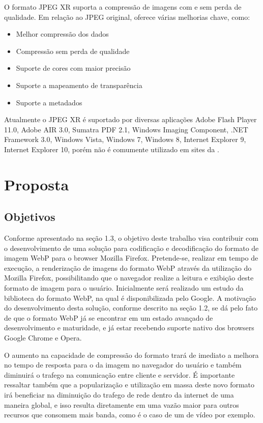 \documentclass[espaco=simples,appendix=Name]{abnt}
\begin{document}
O formato JPEG XR suporta a compressão de imagens com e sem perda de qualidade. Em relação ao JPEG original, oferece várias melhorias chave, como:
\begin{itemize}
\item Melhor compressão dos dados
\item Compressão sem perda de qualidade
\item Suporte de cores com maior precisão
\item Suporte a  mapeamento de transparência
\item Suporte a metadados
\end{itemize}

Atualmente o JPEG XR é suportado por diversas aplicações Adobe Flash Player 11.0, Adobe AIR 3.0, Sumatra PDF 2.1, Windows Imaging Component, .NET Framework 3.0, Windows Vista, Windows 7, Windows 8, Internet Explorer 9, Internet Explorer 10, porém não é comumente utilizado em sites da .\cite{HDPhoto}

\chapter{Proposta}

\section{Objetivos}

Conforme apresentado na seção 1.3, o objetivo deste trabalho visa contribuir com o desenvolvimento de uma solução para codificação e decodificação do formato de imagem WebP para o browser Mozilla Firefox. 
Pretende-se, realizar em tempo de execução, a renderização de imagens do formato WebP através da utilização do Mozilla Firefox, possibilitando que o navegador realize a leitura e exibição deste formato de imagem para o usuário. Inicialmente será realizado um estudo da biblioteca do formato WebP, na qual é disponibilizada pelo Google. 
A motivação do desenvolvimento desta solução, conforme descrito na seção 1.2, se dá pelo fato de que o formato WebP já se encontrar em um estado avançado de desenvolvimento e maturidade, e já estar recebendo suporte nativo dos browsers Google Chrome e Opera. 

O aumento na capacidade de compressão do formato  trará de imediato a melhora no tempo de resposta para o  da imagem no navegador do usuário e também diminuirá o trafego na comunicação entre cliente e servidor. É importante ressaltar também que a popularização e utilização em massa deste novo formato irá beneficiar na diminuição do trafego de rede dentro da internet de uma maneira global, e isso resulta diretamente em uma vazão maior para outros recursos que consomem mais banda, como é o caso de um  de vídeo por exemplo.
\end{document}
